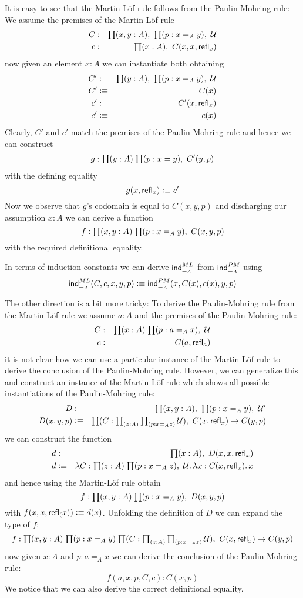 It is easy to see that the Martin-L\"of rule follows from the
Paulin-Mohring rule: We assume 
the premises of the Martin-L\"of rule
\begin{eqnarray*}
C & : & \prd{x,y:A}\prd{p:x =_A y} \UU  \\
c & :  & \prd{x:A} C(x,x,\refl{x})
\end{eqnarray*}
now given an element $x:A$ we can instantiate both obtaining
\begin{eqnarray*}
C' & : & \prd{y:A}\prd{p:x =_A y} \UU  \\
C' & \defeq & C(x) \\
c' & : & C'(x,\refl{x}) \\
c' & \defeq & c(x)
\end{eqnarray*}
Clearly, $C'$ and $c'$ match the premises of the Paulin-Mohring rule and hence we can construct 
\begin{eqnarray*}
g : \prd{y:A}{p : x = y} C'(y,p)
\end{eqnarray*}
with the defining equality
\[ g(x,\mathsf{refl}_{x}) \vcentcolon\equiv c' \]
Now we observe that $g$'s codomain is equal to $C(x,y,p)$ and discharging our assumption
$x:A$ we can derive a function 
\[ f : \prd{x,y:A}{p : x =_A y} C(x,y,p) \]
with the required definitional equality.

In terms of induction constants we can derive $\mathsf{ind}_{=_A}^{ML}$ from $\mathsf{ind}_{=_A}^{PM}$ using
\[ \mathsf{ind}_{=_A}^{ML}(C,c,x,y,p) \vcentcolon\equiv \mathsf{ind}_{=_A}^{PM}(x,C(x),c(x),y,p) \]

The other direction is a bit more tricky: To derive the Paulin-Mohring rule from the Martin-L\"of rule 
we assume $a : A$ and the premises of the Paulin-Mohring rule:
\begin{eqnarray*}
C & : & \prd{x:A}{p : a =_A x} \UU \\  
c & : & C(a,\refl{a})
\end{eqnarray*}
it is not clear how we can use a particular instance of the Martin-L\"of rule to derive the conclusion of 
the Paulin-Mohring rule. However, we can generalize this and construct an instance of the Martin-L\"of rule which shows 
all possible instantiations of the Paulin-Mohring rule:
\begin{eqnarray*}
D & : & \prd{x,y:A}\prd{p:x =_A y} \UU' \\
D(x,y,p) & \defeq & \prd{C : \prd{z:A}{p : x =_A z} \UU} C(x,\refl{x}) \to C(y,p)
\end{eqnarray*}
we can construct the function
\begin{eqnarray*}
d & : & \prd{x : A} D(x,x,\refl{x}) \\
d & \defeq & \lam{C:\prd{z:A}{p : x =_A z} \UU}\lam{x:C(x,\refl{x})} x
\end{eqnarray*}
and hence using the Martin-L\"of rule obtain
\[ f : \prd{x,y:A}{p:x =_A y} D(x,y,p) \]
with $f(x,x,\mathsf{refl}_{(} x)) \vcentcolon\equiv d(x)$. Unfolding the definition of $D$ we can expand the type of $f$:
\[ f : \prd{x,y:A}{p:x =_A y}{C : \prd{z:A}{p : x =_A z} \UU} C(x,\refl{x}) \to C(y,p) \]
now given $x:A$ and $p:a =_A x$ we can derive the conclusion of the Paulin-Mohring rule:
\[ f(a,x,p,C,c) : C(x,p) \]
We notice that we can also derive the correct definitional equality.


